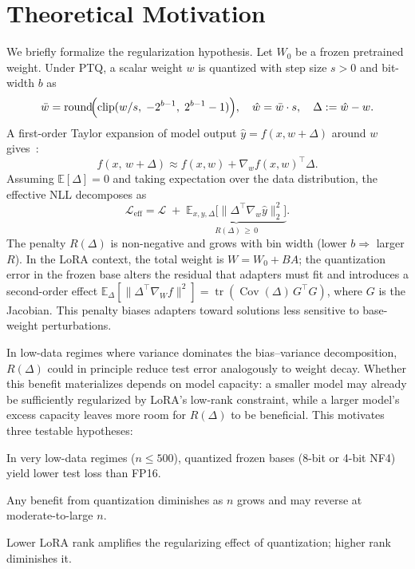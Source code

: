 \documentclass{article}
\begin{document}
\section{Theoretical Motivation}
\label{sec:theory}

We briefly formalize the regularization hypothesis. Let $W_0$ be a frozen pretrained
weight. Under PTQ, a scalar weight $w$ is quantized with step size $s > 0$ and
bit-width $b$ as
\begin{equation}
  \bar{w} = \operatorname{round}\!\Bigl(\operatorname{clip}(w/s,\;-2^{b-1},\;2^{b-1}-1)\Bigr),\quad
  \hat{w} = \bar{w}\cdot s, \quad
  \Delta := \hat{w} - w.
  \label{eq:quant}
\end{equation}
A first-order Taylor expansion of model output $\hat{y} = f(x, w+\Delta)$ around
$w$ gives~\citep{askarihemmat2024quantization}:
\begin{equation}
  f(x,\, w + \Delta) \approx f(x,w) + \nabla_w f(x,w)^\top \Delta.
  \label{eq:taylor}
\end{equation}
Assuming $\mathbb{E}[\Delta]=0$ and taking expectation over the data distribution,
the effective NLL decomposes as
\begin{equation}
  \mathcal{L}_{\mathrm{eff}} = \mathcal{L} \;+\;
  \underbrace{\mathbb{E}_{x,y,\Delta}\!\bigl[\|\Delta^\top \nabla_w \hat{y}\|_2^2\bigr]}_{R(\Delta)\,\geq\,0}.
  \label{eq:reg}
\end{equation}
The penalty $R(\Delta)$ is non-negative and grows with bin width (lower $b
\Rightarrow$ larger $R$). In the LoRA context, the total weight is $W = W_0 + BA$;
the quantization error in the frozen base alters the residual that adapters must fit
and introduces a second-order effect
$\mathbb{E}_\Delta[\|\Delta^\top \nabla_W f\|^2] = \operatorname{tr}(\operatorname{Cov}(\Delta)\,G^\top G)$,
where $G$ is the Jacobian. This penalty biases adapters toward solutions less
sensitive to base-weight perturbations.

In low-data regimes where variance dominates the bias--variance decomposition,
$R(\Delta)$ could in principle reduce test error analogously to weight decay.
Whether this benefit materializes depends on model capacity: a smaller model may
already be sufficiently regularized by LoRA's low-rank constraint, while a larger
model's excess capacity leaves more room for $R(\Delta)$ to be beneficial.
This motivates three testable hypotheses:
\begin{description}[nosep]
  \item[\textbf{H1:}] In very low-data regimes ($n \leq 500$), quantized frozen
    bases (8-bit or 4-bit NF4) yield lower test loss than FP16.
  \item[\textbf{H2:}] Any benefit from quantization diminishes as $n$ grows and
    may reverse at moderate-to-large $n$.
  \item[\textbf{H3:}] Lower LoRA rank amplifies the regularizing effect of
    quantization; higher rank diminishes it.
\end{description}
\end{document}

